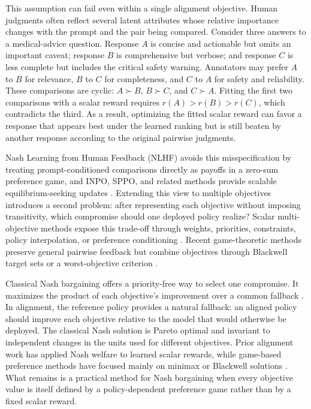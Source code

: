 \documentclass{article}
\theoremstyle{remark}
\theoremstyle{plain}
\begin{document}
This assumption can fail even within a single alignment objective. Human judgments often reflect several latent attributes whose relative importance changes with the prompt and the pair being compared. Consider three answers to a medical-advice question. Response $A$ is concise and actionable but omits an important caveat; response $B$ is comprehensive but verbose; and response $C$ is less complete but includes the critical safety warning. Annotators may prefer $A$ to $B$ for relevance, $B$ to $C$ for completeness, and $C$ to $A$ for safety and reliability. These comparisons are cyclic: $A\succ B$, $B\succ C$, and $C\succ A$. Fitting the first two comparisons with a scalar reward requires $r(A)>r(B)>r(C)$, which contradicts the third. As a result, optimizing the fitted scalar reward can favor a response that appears best under the learned ranking but is still beaten by another response according to the original pairwise judgments.

Nash Learning from Human Feedback (NLHF) avoids this misspecification by treating prompt-conditioned comparisons directly as payoffs in a zero-sum preference game, and INPO, SPPO, and related methods provide scalable equilibrium-seeking updates \citep{munos2024nash,zhang2025iterative,wu2025sppo,calandriello2024online,rosset2024direct,zhou2025egpo}. Extending this view to multiple objectives introduces a second problem: after representing each objective without imposing transitivity, which compromise should one deployed policy realize? Scalar multi-objective methods expose this trade-off through weights, priorities, constraints, policy interpolation, or preference conditioning \citep{zhou2024beyond,rame2023rewarded,zhong2024panacea,chakraborty2024maxmin,son2026rmod,agnihotri2026mopo}. Recent game-theoretic methods preserve general pairwise feedback but combine objectives through Blackwell target sets or a worst-objective criterion \citep{blackwell1956analog,bhatia2020multicriteria,zhang2026prosper}.

Classical Nash bargaining offers a priority-free way to select one compromise. It maximizes the product of each objective's improvement over a common fallback \citep{nash1950}. In alignment, the reference policy provides a natural fallback: an aligned policy should improve each objective relative to the model that would otherwise be deployed. The classical Nash solution is Pareto optimal and invariant to independent changes in the units used for different objectives. Prior alignment work has applied Nash welfare to learned scalar rewards, while game-based preference methods have focused mainly on minimax or Blackwell solutions \citep{zhong2024nashwelfare,navon2022nashmtl,zhang2026prosper}. What remains is a practical method for Nash bargaining when every objective value is itself defined by a policy-dependent preference game rather than by a fixed scalar reward.
\end{document}
